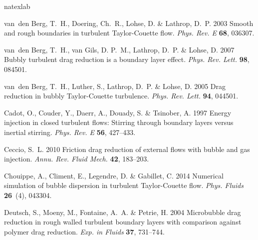 \documentclass{jfm}
\begin{document}
\begin{thebibliography}{47}
\expandafter\ifx\csname natexlab\endcsname\relax\def\natexlab#1{#1}\fi
\def\au#1{#1} \def\ed#1{#1} \def\yr#1{#1}\def\at#1{#1}\def\jt#1{\textit{#1}}
  \def\bt#1{#1}\def\bvol#1{\textbf{#1}} \def\vol#1{#1} \def\pg#1{#1}
  \def\publ#1{#1}\def\arxiv#1{#1}\def\org#1{#1}\def\st#1{\textit{#1}}

{\sc \au{van~den Berg, T.~H.}, \au{Doering, Ch.~R.}, \au{Lohse, D.} \&
  \au{Lathrop, D.~P.}} \yr{2003}  \at{Smooth and rough boundaries in turbulent
  {{Taylor-Couette}} flow}.  \jt{Phys. Rev. E}  \bvol{68},  \pg{036307}.

{\sc \au{van~den Berg, T.~H.}, \au{van Gils, D. P.~M.}, \au{Lathrop, D.~P.} \&
  \au{Lohse, D.}} \yr{2007}  \at{Bubbly turbulent drag reduction is a boundary
  layer effect}.  \jt{Phys. Rev. Lett.}  \bvol{98},  \pg{084501}.

{\sc \au{van~den Berg, T.~H.}, \au{Luther, S.}, \au{Lathrop, D.~P.} \&
  \au{Lohse, D.}} \yr{2005}  \at{{Drag reduction in bubbly Taylor-Couette
  turbulence}}.  \jt{Phys. Rev. Lett.}  \bvol{94},  \pg{044501}.

{\sc \au{Cadot, O.}, \au{Couder, Y.}, \au{Daerr, A.}, \au{Douady, S.} \&
  \au{Tsinober, A.}} \yr{1997}  \at{Energy injection in closed turbulent flows:
  Stirring through boundary layers versus inertial stirring}.  \jt{Phys. Rev.
  E}  \bvol{56},  \pg{427--433}.

{\sc \au{Ceccio, S.~L.}} \yr{2010}  \at{Friction drag reduction of external
  flows with bubble and gas injection}.  \jt{Annu. Rev. Fluid Mech.}
  \bvol{42},  \pg{183--203}.

{\sc \au{Chouippe, A.}, \au{Climent, E.}, \au{Legendre, D.} \& \au{Gabillet,
  C.}} \yr{2014}  \at{Numerical simulation of bubble dispersion in turbulent
  {{Taylor-Couette}} flow}.  \jt{Phys. Fluids}  \bvol{26}~(4),  \pg{043304}.

{\sc \au{Deutsch, S.}, \au{Moeny, M.}, \au{Fontaine, A.~A.} \& \au{Petrie, H.}}
  \yr{2004}  \at{Microbubble drag reduction in rough walled turbulent boundary
  layers with comparison against polymer drag reduction}.  \jt{Exp. in Fluids}
  \bvol{37},  \pg{731--744}.


\end{thebibliography}
\end{document}
